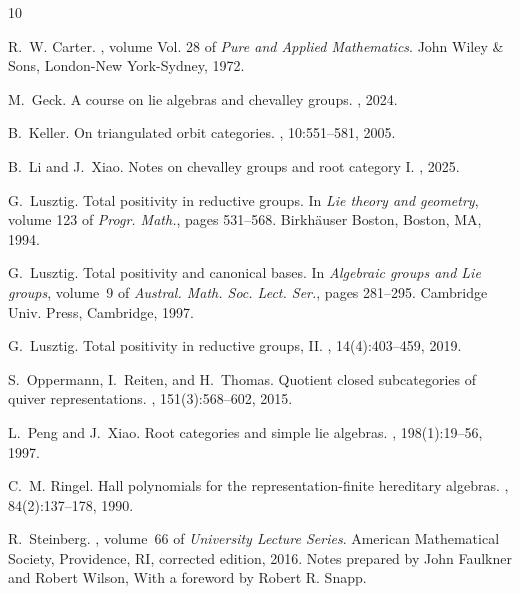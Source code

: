\documentclass[12pt]{amsart}
\begin{document}
\begin{thebibliography}{10}

R.~W. Carter.
, volume Vol. 28 of {\em Pure and
  Applied Mathematics}.
\newblock John Wiley \& Sons, London-New York-Sydney, 1972.

M.~Geck.
\newblock A course on lie algebras and chevalley groups.
, 2024.

B.~Keller.
\newblock On triangulated orbit categories.
, 10:551--581, 2005.

B.~Li and J.~Xiao.
\newblock Notes on chevalley groups and root category {I}.
, 2025.

G.~Lusztig.
\newblock Total positivity in reductive groups.
\newblock In {\em Lie theory and geometry}, volume 123 of {\em Progr. Math.},
  pages 531--568. Birkh\"auser Boston, Boston, MA, 1994.

G.~Lusztig.
\newblock Total positivity and canonical bases.
\newblock In {\em Algebraic groups and {L}ie groups}, volume~9 of {\em Austral.
  Math. Soc. Lect. Ser.}, pages 281--295. Cambridge Univ. Press, Cambridge,
  1997.

G.~Lusztig.
\newblock Total positivity in reductive groups, {II}.
, 14(4):403--459, 2019.

S.~Oppermann, I.~Reiten, and H.~Thomas.
\newblock Quotient closed subcategories of quiver representations.
, 151(3):568--602, 2015.

L.~Peng and J.~Xiao.
\newblock Root categories and simple lie algebras.
, 198(1):19--56, 1997.

C.~M. Ringel.
\newblock Hall polynomials for the representation-finite hereditary algebras.
, 84(2):137--178, 1990.

R.~Steinberg.
, volume~66 of {\em University
  Lecture Series}.
\newblock American Mathematical Society, Providence, RI, corrected edition,
  2016.
\newblock Notes prepared by John Faulkner and Robert Wilson, With a foreword by
  Robert R. Snapp.

\end{thebibliography}
\end{document}
